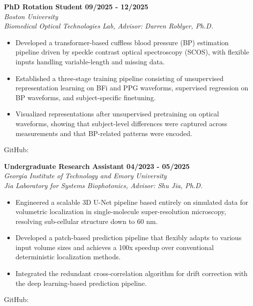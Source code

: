 \documentclass[letterpaper, 11pt]{article}
\newcommand{\subsectionvspace}{\vspace{8pt}}
\begin{document}
    \textbf{PhD Rotation Student \hfill 09/2025 - 12/2025} \\
    \textit{Boston University} \\
    \textit{Biomedical Optical Technologies Lab, Advisor: Darren Roblyer, Ph.D.}
    \begin{itemize}
        \item Developed a transformer-based cuffless blood pressure (BP) estimation pipeline driven by speckle contrast optical spectroscopy (SCOS), with flexible inputs handling variable-length and missing data.
        \item Established a three-stage training pipeline consisting of unsupervised representation learning on BFi and PPG waveforms, supervised regression on BP waveforms, and subject-specific finetuning.
        \item Visualized representations after unsupervised pretraining on optical waveforms, showing that subject-level differences were captured across measurements and that BP-related patterns were encoded.
    \end{itemize}
    GitHub: \href{https://github.com/tianrui-qi/SCOS-BP}{}

    \subsectionvspace

    \textbf{Undergraduate Research Assistant \hfill 04/2023 - 05/2025} \\
    \textit{Georgia Institute of Technology and Emory University} \\
    \textit{Jia Laboratory for Systems Biophotonics, Advisor: Shu Jia, Ph.D.}
    \begin{itemize}
        \item Engineered a scalable 3D U-Net pipeline based entirely on simulated data for volumetric localization in single-molecule super-resolution microscopy, resolving sub-cellular structure down to 60 nm.
        \item Developed a patch-based prediction pipeline that flexibly adapts to various input volume sizes and achieves a 100x speedup over conventional deterministic localization methods.
        \item Integrated the redundant cross-correlation algorithm for drift correction with the deep learning-based prediction pipeline.
    \end{itemize}
    GitHub: \href{https://github.com/tianrui-qi/DSMLM}{}

    \subsectionvspace
\end{document}

